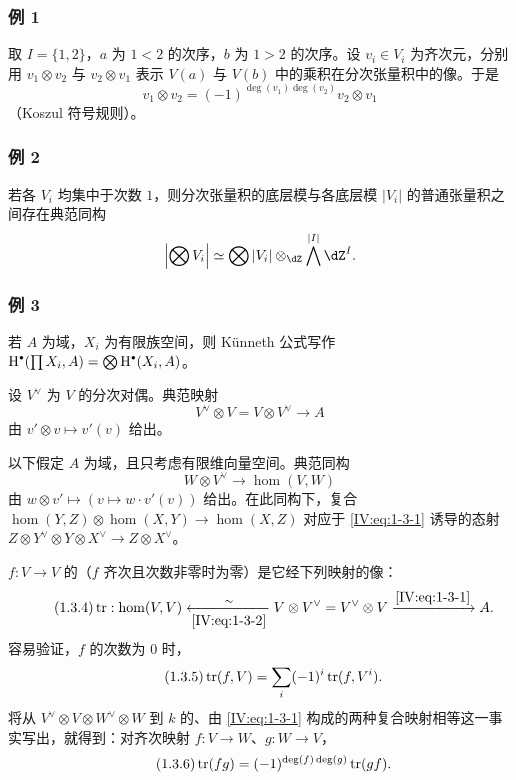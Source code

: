 \subsubsection*{例 1}
取 $I=\{1,2\}$，$a$ 为 $1<2$ 的次序，$b$ 为 $1>2$ 的次序。设 $v_i\in V_i$ 为齐次元，分别用 $v_1\otimes v_2$ 与 $v_2\otimes v_1$ 表示 $V(a)$ 与 $V(b)$ 中的乘积在分次张量积中的像。于是
\[
v_1\otimes v_2=(-1)^{\deg(v_1)\deg(v_2)}v_2\otimes v_1
\]
（Koszul 符号规则）。

\subsubsection*{例 2}
若各 $V_i$ 均集中于次数 $1$，则分次张量积的底层模与各底层模 $|V_i|$ 的普通张量积之间存在典范同构
\[
\left|\bigotimes V_i\right|\simeq\bigotimes|V_i|\otimes_{\dZ}\bigwedge^{|I|}\dZ^I.
\]

\subsubsection*{例 3}
若 $A$ 为域，$X_i$ 为有限族空间，则 Künneth 公式写作
$\h^\bullet(\prod X_i,A)=\bigotimes\h^\bullet(X_i,A)$。

设 $V^\vee$ 为 $V$ 的分次对偶。典范映射
\begin{equation*}\tag{1.3.1}\label{IV:eq:1-3-1}
V^\vee\otimes V=V\otimes V^\vee\longrightarrow A
\end{equation*}
由 $v'\otimes v\mapsto v'(v)$ 给出。

以下假定 $A$ 为域，且只考虑有限维向量空间。典范同构
\begin{equation*}\tag{1.3.2}\label{IV:eq:1-3-2}
W\otimes V^\vee\longrightarrow\hom(V,W)
\end{equation*}
由 $w\otimes v'\mapsto(v\mapsto w\cdot v'(v))$ 给出。在此同构下，复合
$\hom(Y,Z)\otimes\hom(X,Y)\to\hom(X,Z)$ 对应于 \eqref{IV:eq:1-3-1} 诱导的态射 $Z\otimes Y^\vee\otimes Y\otimes X^\vee\to Z\otimes X^\vee$。

$f:V\to V$ 的（$f$ 齐次且次数非零时为零）是它经下列映射的像：
\begin{equation*}\tag{1.3.4}\label{IV:eq:1-3-4}
\operatorname{tr}:\hom(V,V)\xleftarrow[\eqref{IV:eq:1-3-2}]{\sim}
V\otimes V^\vee=V^\vee\otimes V\xrightarrow{\eqref{IV:eq:1-3-1}}A.
\end{equation*}
容易验证，$f$ 的次数为 $0$ 时，
\begin{equation*}\tag{1.3.5}\label{IV:eq:1-3-5}
\operatorname{tr}(f,V)=\sum_i(-1)^i\operatorname{tr}(f,V^i).
\end{equation*}
将从 $V^\vee\otimes V\otimes W^\vee\otimes W$ 到 $k$ 的、由 \eqref{IV:eq:1-3-1} 构成的两种复合映射相等这一事实写出，就得到：对齐次映射 $f:V\to W$、$g:W\to V$，
\begin{equation*}\tag{1.3.6}\label{IV:eq:1-3-6}
\operatorname{tr}(fg)=(-1)^{\deg(f)\deg(g)}\operatorname{tr}(gf).
\end{equation*}

